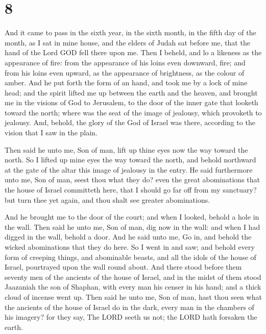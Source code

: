 \hypertarget{section-7}{%
\section{8}\label{section-7}}

 And it came to pass in the sixth year, in the sixth month,
in the fifth day of the month, as I sat in mine house, and the elders of
Judah sat before me, that the hand of the Lord GOD fell there upon me.
 Then I beheld, and lo a likeness as the appearance of fire:
from the appearance of his loins even downward, fire; and from his loins
even upward, as the appearance of brightness, as the colour of amber.
 And he put forth the form of an hand, and took me by a lock
of mine head; and the spirit lifted me up between the earth and the
heaven, and brought me in the visions of God to Jerusalem, to the door
of the inner gate that looketh toward the north; where was the seat of
the image of jealousy, which provoketh to jealousy.  And,
behold, the glory of the God of Israel was there, according to the
vision that I saw in the plain.

 Then said he unto me, Son of man, lift up thine eyes now
the way toward the north. So I lifted up mine eyes the way toward the
north, and behold northward at the gate of the altar this image of
jealousy in the entry.  He said furthermore unto me, Son of
man, seest thou what they do? even the great abominations that the house
of Israel committeth here, that I should go far off from my sanctuary?
but turn thee yet again, and thou shalt see greater abominations.

 And he brought me to the door of the court; and when I
looked, behold a hole in the wall.  Then said he unto me,
Son of man, dig now in the wall: and when I had digged in the wall,
behold a door.  And he said unto me, Go in, and behold the
wicked abominations that they do here.  So I went in and
saw; and behold every form of creeping things, and abominable beasts,
and all the idols of the house of Israel, pourtrayed upon the wall round
about.  And there stood before them seventy men of the
ancients of the house of Israel, and in the midst of them stood
Jaazaniah the son of Shaphan, with every man his censer in his hand; and
a thick cloud of incense went up.  Then said he unto me,
Son of man, hast thou seen what the ancients of the house of Israel do
in the dark, every man in the chambers of his imagery? for they say, The
LORD seeth us not; the LORD hath forsaken the earth.

